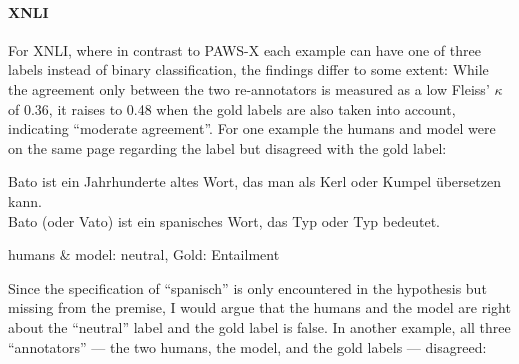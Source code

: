 {%







\paragraph*{XNLI}

For XNLI, where in contrast to PAWS-X each example can have one of three labels instead of
binary classification, the findings differ to some extent: While the agreement only between
the two re-annotators is measured as a low Fleiss' $\kappa$ of 0.36, it raises to 0.48
when the gold labels are also taken into account, indicating ``moderate agreement''. For
one example the humans and model were on the same page regarding the label but disagreed
with the gold label:



\begin{examples}
  \item Bato ist ein Jahrhunderte altes Wort, das man als Kerl oder Kumpel übersetzen kann.\\
        Bato (oder Vato) ist ein spanisches Wort, das Typ oder Typ bedeutet.

        humans \& model: neutral, Gold: Entailment
\end{examples}

Since the specification of ``spanisch'' is only encountered in the hypothesis but missing from the premise,
I would argue that the humans and the model are right about the ``neutral'' label and the gold label
is false.
In another example, all three ``annotators'' --- the two humans, the model, and the gold labels --- disagreed:

}
